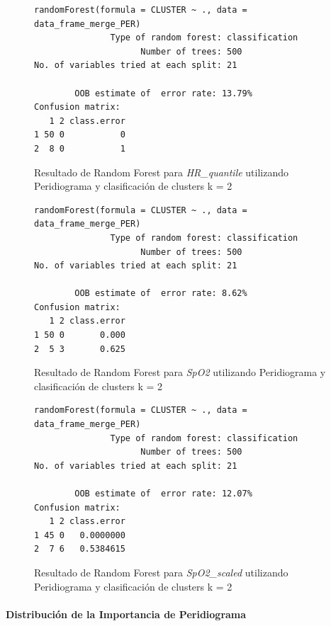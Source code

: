 \begin{figure}[H]
    \centering
    \begin{lstlisting}[frame=single, basicstyle=\small\ttfamily]
        randomForest(formula = CLUSTER ~ ., data = data_frame_merge_PER) 
               Type of random forest: classification
                     Number of trees: 500
No. of variables tried at each split: 21

        OOB estimate of  error rate: 13.79%
Confusion matrix:
   1 2 class.error
1 50 0           0
2  8 0           1
    \end{lstlisting}
    \caption{Resultado de Random Forest para \textit{HR\_quantile} utilizando Peridiograma y clasificación de clusters k = 2}
    \label{fig:random_forest_per_result_RF_3}
\end{figure}

\begin{figure}[H]
    \centering
    \begin{lstlisting}[frame=single, basicstyle=\small\ttfamily]
        randomForest(formula = CLUSTER ~ ., data = data_frame_merge_PER) 
               Type of random forest: classification
                     Number of trees: 500
No. of variables tried at each split: 21

        OOB estimate of  error rate: 8.62%
Confusion matrix:
   1 2 class.error
1 50 0       0.000
2  5 3       0.625
    \end{lstlisting}
    \caption{Resultado de Random Forest para \textit{SpO2} utilizando Peridiograma y clasificación de clusters k = 2}\label{fig:random_forest_per_result_RF_4}
\end{figure}
\begin{figure}[H]
    \centering
    \begin{lstlisting}[frame=single, basicstyle=\small\ttfamily]
        randomForest(formula = CLUSTER ~ ., data = data_frame_merge_PER) 
               Type of random forest: classification
                     Number of trees: 500
No. of variables tried at each split: 21

        OOB estimate of  error rate: 12.07%
Confusion matrix:
   1 2 class.error
1 45 0   0.0000000
2  7 6   0.5384615
    \end{lstlisting}
    \caption{Resultado de Random Forest para \textit{SpO2\_scaled} utilizando Peridiograma y clasificación de clusters k = 2}
    \label{fig:random_forest_per_result_RF_5}
\end{figure}

\paragraph{Distribución de la Importancia de Peridiograma}

